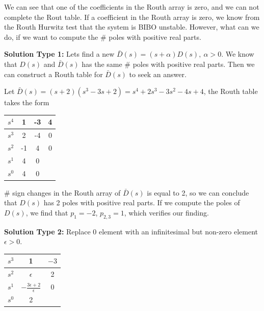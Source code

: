 \documentclass[twoside]{article}
\begin{document}
We can see that one of the coefficients in the Routh array is zero,
and we can not complete the Rout table. If a coefficient in the Routh
array is zero, we know from the Routh Hurwitz test that the system is
BIBO unstable. However, what can we do, if we want to compute the 
$\#$ poles with positive real parts. 

\vspace{12pt}

\textbf{Solution Type 1:} Lets find a new $\bar{D}(s) = (s + \alpha)
D(s), \ \alpha > 0$. We know that $D(s)$ and $\bar{D}(s)$ has the same 
$\#$ poles with positive real parts. Then we can construct a Routh
table for $\bar{D}(s)$ to seek an answer. 

Let $\bar{D}(s) = (s + 2) ( s^3 - 3 s + 2) = s^4 + 2 s^3 - 3 s^2 - 4 s+ 4$, the Routh table takes the form

%
\begin{table}[h]
\begin{center}
\begin{tabular}{|c || c || c c |}
\hline
$s^4$ & 1 & -3 & 4 
\\ \hline
$s^3$ & 2 & -4 & 0
\\ \hline
$s^2$ & -1 & 4 & 0
\\ \hline
$s^1$ & 4 & 0 &
\\ \hline
$s^0$ & 4 & 0 & 
\\ \hline
\end{tabular}
\end{center}
\end{table}
%
$\#$ sign changes in the Routh array of $\bar{D}(s)$ is equal to 2, so
we can conclude that $D(s)$ has 2 poles with positive real parts. If
we compute the poles of $D(s)$, we find that $p_1 = -2$, $p_{2,3} = 1$,
which verifies our finding. 

\vspace{12pt}

\textbf{Solution Type 2:} Replace 0 element with an infinitesimal but
non-zero element $\epsilon >0$.
%
\begin{table}[h]
\begin{center}
\begin{tabular}{|c || c || c  |}
\hline
$s^3$ & 1 & $-3$ 
\\ \hline
$s^2$ & $\epsilon$ & 2
\\ \hline
$s^1$  & $- \frac{3 \epsilon + 2}{\epsilon}$ & 0 
\\ \hline
$s^0$  & 2 & 
\\ \hline
\end{tabular}
\end{center}
\end{table}
\end{document}
